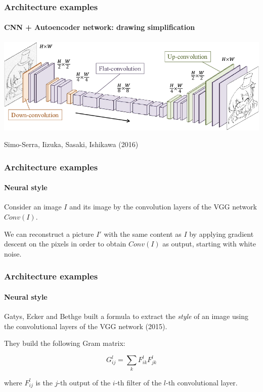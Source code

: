 \documentclass[9pt]{beamer}
\begin{document}
\begin{frame}
  \frametitle{Architecture examples}

  \framesubtitle{CNN + Autoencoder network: drawing simplification}

  \begin{center}
    \includegraphics[width=\linewidth]{images/drawing_simplification.png}
  \end{center}

  Simo-Serra, Iizuka, Sasaki, Ishikawa (2016)
\end{frame}

\begin{frame}
  \frametitle{Architecture examples}

  \framesubtitle{Neural style}
  
  Consider an image $I$ and its image by the convolution layers of the
  VGG network $Conv(I)$.

  \pause
  \bigskip

  We can reconstruct a picture $I'$ with the same content as $I$ by
  applying gradient descent on the pixels in order to obtain $Conv(I)$
  as output, starting with white noise.

  \begin{center}
    \scalebox{0.6}{
      
    }
  \end{center}
\end{frame}

\begin{frame}
  \frametitle{Architecture examples}

  \framesubtitle{Neural style}
  
  Gatys, Ecker and Bethge built a formula to extract the
  \textit{style} of an image using the convolutional layers of the VGG
  network (2015).

  \bigskip

  They build the following Gram matrix:

  \bigskip

  \[
  G_{ij}^{l} = \sum_{k} F_{ik}^{l} F_{jk}^{l}
  \]

  \bigskip

  where $F_{ij}^{l}$ is the $j$-th output of the $i$-th filter of the
  $l$-th convolutional layer.

\end{frame}
\end{document}

